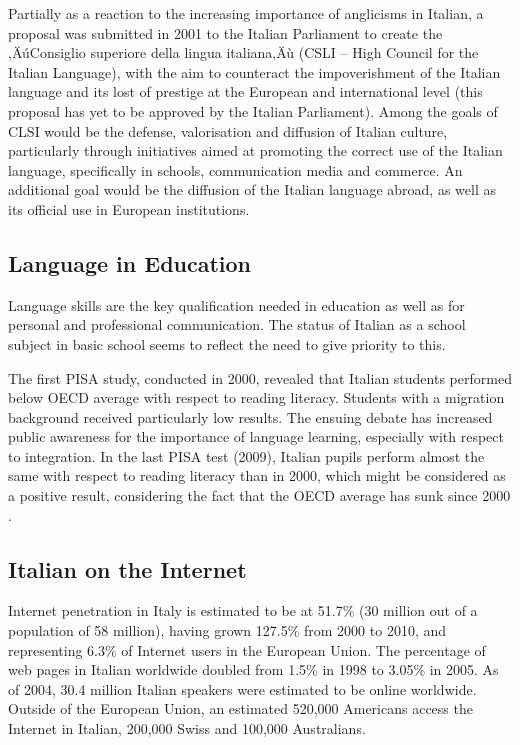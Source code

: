 \begin{multicols}{2}

Partially as a reaction to the increasing importance of anglicisms in Italian,
a proposal was submitted in 2001 to the Italian Parliament to create the
‚ÄúConsiglio superiore della lingua italiana‚Äù (CSLI -- High Council for the
Italian Language), with the aim to counteract the impoverishment of the
Italian language and its lost of prestige at the European and international
level (this proposal has yet to be approved by the Italian Parliament). Among
the goals of CLSI would be the defense, valorisation and diffusion of Italian
culture, particularly through initiatives aimed at promoting the correct use
of the Italian language, specifically in schools, communication media and
commerce. An additional goal would be the diffusion of the Italian language
abroad, as well as its official use in European institutions.

\subsection{Language in Education}

Language skills are the key qualification needed in education as well as for
personal and professional communication. The status of Italian as a school
subject in basic school seems to reflect the need to give priority to this. 

The first PISA study, conducted in 2000, revealed that Italian
students performed below OECD average with respect to reading
literacy. Students with a migration background received particularly
low results. The ensuing debate has increased public awareness for the
importance of language learning, especially with respect to
integration. In the last PISA test (2009), Italian pupils perform
almost the same with respect to reading literacy than in 2000, which
might be considered as a positive result, considering the fact that
the OECD average has sunk since 2000 \cite{Pisa1}.



\subsection{Italian on the Internet}

Internet penetration in Italy is estimated to be at 51.7\% (30 million out of
a population of 58 million), having grown 127.5\% from 2000 to 2010, and
representing 6.3\% of Internet users in the European Union. The percentage of
web pages in Italian worldwide doubled from 1.5\% in 1998 to 3.05\% in
2005. As of 2004, 30.4 million Italian speakers were estimated to be online
worldwide. Outside of the European Union, an estimated 520,000 Americans
access the Internet in Italian, 200,000 Swiss and 100,000 Australians.


\end{multicols}
